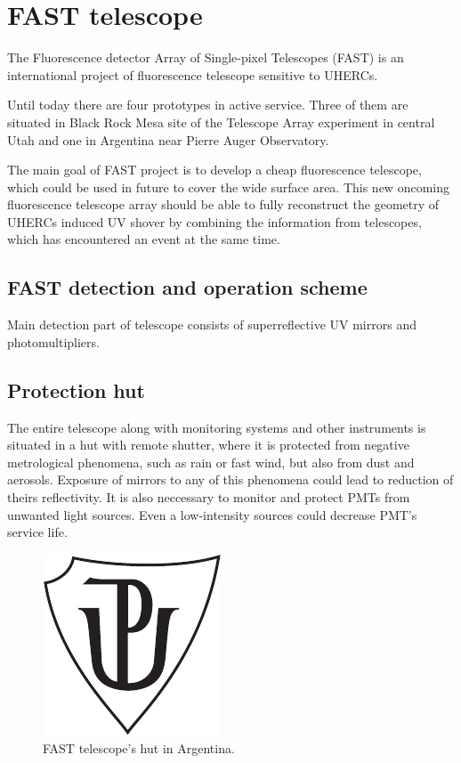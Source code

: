 
\chapter{FAST telescope}
The  Fluorescence  detector  Array  of  Single-pixel  Telescopes  (FAST) is an international project of fluorescence telescope sensitive to UHERCs. 
\par
Until today there are four prototypes in active service. Three of them are situated in Black Rock Mesa site of the Telescope Array experiment in central Utah and one in Argentina near Pierre Auger Observatory.
\par
The main goal of FAST project is to develop a cheap fluorescence telescope, which could be used in future to cover the wide surface area. This new oncoming fluorescence telescope array should be able  
to fully reconstruct the geometry of UHERCs induced UV shover by combining the information from telescopes, which has encountered an event at the same time. 
\section{FAST detection and operation scheme}
Main detection part of telescope consists of superreflective UV mirrors and photomultipliers. 


\par

\section{Protection hut}
The entire telescope along with monitoring systems and other instruments is situated in a hut with remote shutter, where it is protected from negative metrological phenomena, such as rain or fast wind, but also from dust and aerosols. Exposure of mirrors to any of this phenomena could lead to reduction of theirs reflectivity. It is also neccessary to monitor and protect PMTs from unwanted light sources. Even a low-intensity sources could decrease PMT's service life.

\begin{figure}[H]
 \centering
 \includegraphics{up_logo_bw}
 \caption{FAST telescope's hut in Argentina.}
 \label{FASThut}
 
\end{figure}

